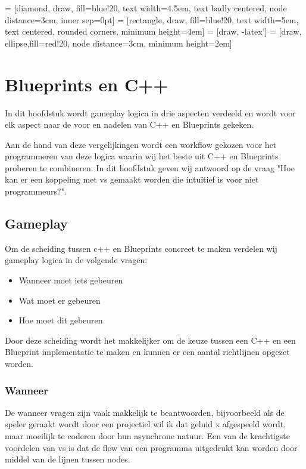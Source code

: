\lstset {language=C++}
 = [diamond, draw, fill=blue!20, 
    text width=4.5em, text badly centered, node distance=3cm, inner sep=0pt]
 = [rectangle, draw, fill=blue!20, 
    text width=5em, text centered, rounded corners, minimum height=4em]
 = [draw, -latex']
 = [draw, ellipse,fill=red!20, node distance=3cm,
    minimum height=2em]

\chapter{Blueprints en C++}
\label{ch:BlueprintsEnCpp}

In dit hoofdstuk wordt gameplay logica in drie aspecten verdeeld en wordt voor elk aspect naar de voor en nadelen van C++ en Blueprints gekeken.

Aan de hand van deze vergelijkingen wordt een workflow gekozen voor het programmeren van deze logica waarin wij het beste uit C++ en Blueprints proberen te combineren.
In dit hoofdstuk geven wij antwoord op de vraag "Hoe kan er een koppeling met \gls{vs} gemaakt worden die intuïtief is voor niet programmeurs?".

\section{Gameplay}

Om de scheiding tussen c++ en Blueprints concreet te maken verdelen wij gameplay logica in de volgende vragen:

\begin{itemize}
	\item Wanneer moet iets gebeuren
	\item Wat moet er gebeuren
	\item Hoe moet dit gebeuren
\end{itemize}

Door deze scheiding wordt het makkelijker om de keuze tussen een C++ en een Blueprint implementatie te maken en kunnen er een aantal richtlijnen opgezet worden.

\subsection{Wanneer}
De wanneer vragen zijn vaak makkelijk te beantwoorden, bijvoorbeeld als de speler geraakt wordt door een projectiel wil ik dat geluid x afgespeeld wordt, maar moeilijk te coderen door hun asynchrone natuur. Een van de krachtigste voordelen van \gls{vs} is dat de flow van een programma uitgedrukt kan worden door middel van de lijnen tussen nodes. 

